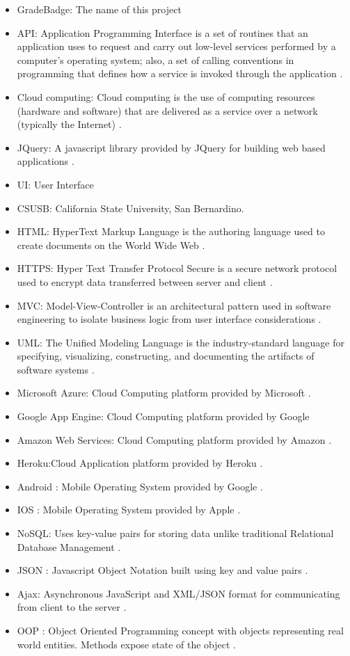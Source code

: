 \begin{itemize}
\item GradeBadge: The name of this project
\item API: Application Programming Interface is a set of routines that an application uses to request and carry out low-level services performed by a computer's operating system; also, a set of calling conventions in programming that defines how a service is invoked through the application \cite{API}.
\item Cloud computing: Cloud computing is the use of computing resources (hardware and software) that are delivered as a service over a network (typically the Internet) \cite{cloudcomputing}.
\item JQuery: A javascript library provided by JQuery for building web based applications \cite{JQuery}.
\item UI: User Interface
\item CSUSB: California State University, San Bernardino.
\item HTML: HyperText Markup Language is the authoring language used to create documents on the World Wide Web \cite{w3}.
\item HTTPS: Hyper Text Transfer Protocol Secure is a secure network protocol used to encrypt data transferred  between server and client \cite{https}.
\item MVC\label{def:mvc}: Model-View-Controller is an architectural pattern used in software engineering to isolate business logic from user interface considerations \cite{MVC}.
\item UML: The Unified Modeling Language is the industry-standard language for specifying, visualizing, constructing, and documenting the artifacts of software systems \cite{uml}.
\item Microsoft Azure: Cloud Computing platform provided by Microsoft \cite{MicrosoftAzure}.
\item Google App Engine: Cloud Computing platform provided by Google 
\item Amazon Web Services: Cloud Computing platform provided by Amazon \cite{AWS}.
\item Heroku:Cloud Application platform provided by Heroku \cite{Heroku}.
\item Android : Mobile Operating System provided by Google \cite{Android}.
\item IOS : Mobile Operating System provided by Apple \cite{IOS}.
\item NoSQL: Uses key-value pairs for storing data unlike traditional Relational Database Management \cite{NoSql}.
\item JSON : Javascript Object Notation built using key and value pairs \cite{json}.
\item Ajax:  Asynchronous JavaScript and XML/JSON format for communicating from client to the server \cite{Ajax}.
\item OOP : Object Oriented Programming concept with objects representing real world entities. Methods expose state of the object \cite{OOP}.
\end{itemize}


